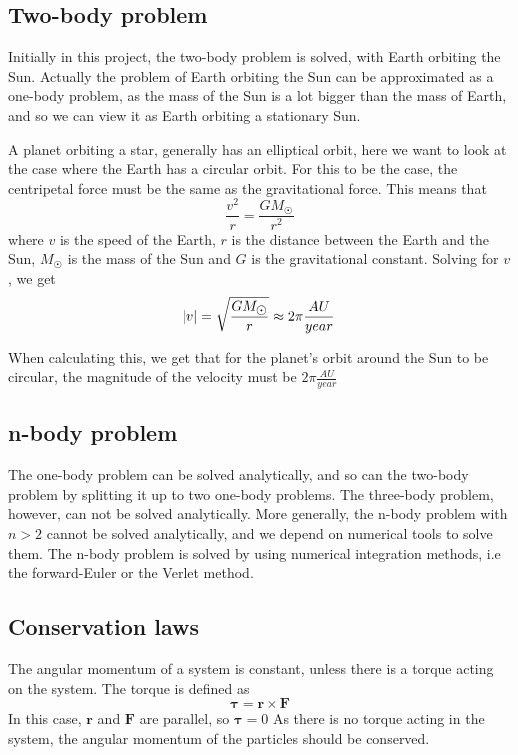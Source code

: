 \subsection{Two-body problem}

Initially in this project, the two-body problem is solved, with Earth orbiting the Sun. Actually the problem of Earth orbiting the Sun can be approximated as a one-body problem, as the mass of the Sun is a lot bigger than the mass of Earth, and so we can view it as Earth orbiting a stationary Sun. 

A planet orbiting a star, generally has an elliptical orbit, here we want to look at the case where the Earth has a circular orbit. For this to be the case, the centripetal force must be the same as the gravitational force. This means that 
\begin{equation}
\frac{v^2}{r} = \frac{G M_{\astrosun}}{r^2}
\end{equation}
where $v$ is the speed of the Earth, $r$ is the distance between the Earth and the Sun, $M_{\astrosun}$ is the mass of the Sun and $G$ is the gravitational constant. 
Solving for $v$, we get
\begin{equation}
\abs{v} = \sqrt{\frac{G M_{\astrosun}}{r}} \approx 2\pi \frac{AU}{year}
\end{equation}

When calculating this, we get that for the planet's orbit around the Sun to be circular, the magnitude of the velocity must be $2\pi  \frac{AU}{year}$


\subsection{n-body problem}
The one-body problem can be solved analytically, and so can the two-body problem by splitting it up to two one-body problems. The three-body problem, however, can not be solved analytically. More generally, the n-body problem with $n>2$ cannot be solved analytically, and we depend on numerical tools to solve them. The n-body problem is solved by using numerical integration methods, i.e the forward-Euler or the Verlet method. 

\subsection{Conservation laws}\label{sec:cons}

The angular momentum of a system is constant, unless there is a torque acting on the system. The torque is defined as 
\begin{equation}
\mathbf{\tau} = \mathbf{r}  \times \mathbf{F}
\end{equation}
In this case, $\mathbf{r}$ and $\mathbf{F}$ are parallel, so $\mathbf{\tau} = 0$
As there is no torque acting in the system, the angular momentum of the particles should be conserved. 

